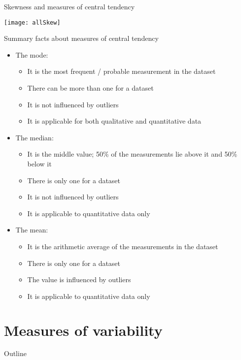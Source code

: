 \documentclass[xcolor=dvipsnames]{beamer}
\begin{document}
\begin{frame}{Skewness and measures of central tendency}
	\begin{center}
		\texttt{[image: allSkew]}
	\end{center}
\end{frame}

\begin{frame}{Summary facts about measures of central tendency}
	\begin{itemize}
		\item The mode:
		\begin{itemize}
			\item It is the most frequent / probable measurement in the dataset
			\item There can be more than one for a dataset
			\item It is not influenced by outliers
			\item It is applicable for both qualitative and quantitative data
		\end{itemize}
		\item The median:
		\begin{itemize}
			\item It is the middle value; 50\% of the measurements lie above it and 50\% below it
			\item There is only one for a dataset
			\item It is not influenced by outliers
			\item It is applicable to quantitative data only 
		\end{itemize}
		\item The mean:
		\begin{itemize}
			\item It is the arithmetic average of the measurements in the dataset
			\item There is only one for a dataset
			\item The value is influenced by outliers
			\item It is applicable to quantitative data only 
		\end{itemize}			
	\end{itemize}
\end{frame}

\section{Measures of variability}
\begin{frame}{Outline}
	\tableofcontents[currentsection,subsectionstyle=show/shaded/hide]
\end{frame}
\end{document}

